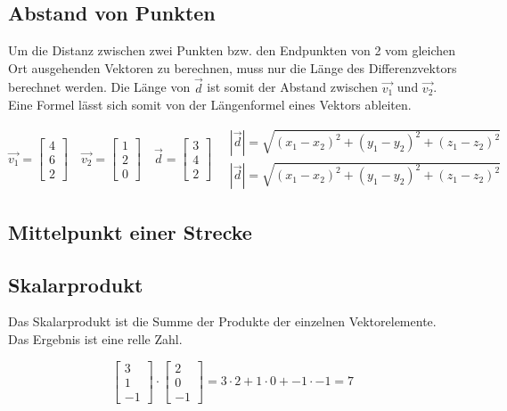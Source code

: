 \subsection{Abstand von Punkten}

Um die Distanz zwischen zwei Punkten bzw. den Endpunkten von 2 vom gleichen Ort
ausgehenden Vektoren zu berechnen, muss nur die Länge des Differenzvektors berechnet
werden. Die Länge von $\overrightarrow{d}$ ist somit der Abstand zwischen
$\overrightarrow{v_1}$ und $\overrightarrow{v_2}$.
Eine Formel lässt sich somit von der Längenformel eines Vektors ableiten.

\begin{equation*}
    \overrightarrow{v_1} =
    \begin{bmatrix}
        4 \\
        6 \\
        2
    \end{bmatrix}
    \quad
    \overrightarrow{v_2} =
    \begin{bmatrix}
        1 \\
        2 \\
        0
    \end{bmatrix}
    \quad
    \overrightarrow{d} =
    \begin{bmatrix}
        3 \\
        4 \\
        2
    \end{bmatrix}
    \quad
    \begin{aligned}
        | \overrightarrow{d} | = \sqrt{(x_1 - x_2)^2 + (y_1 - y_2)^2 + (z_1 - z_2)^2} \\
        | \overrightarrow{d} | = \sqrt{(x_1 - x_2)^2 + (y_1 - y_2)^2 + (z_1 - z_2)^2}
    \end{aligned}
\end{equation*}

\subsection{Mittelpunkt einer Strecke}

\subsection{Skalarprodukt}

Das Skalarprodukt ist die Summe der Produkte der einzelnen Vektorelemente.
Das Ergebnis ist eine relle Zahl.

\begin{equation*}
    \begin{bmatrix}
        3 \\
        1 \\
        -1
    \end{bmatrix} \cdot
    \begin{bmatrix}
        2 \\
        0 \\
        -1
    \end{bmatrix} = 3 \cdot 2 + 1 \cdot 0 + -1 \cdot -1 = 7
\end{equation*}


